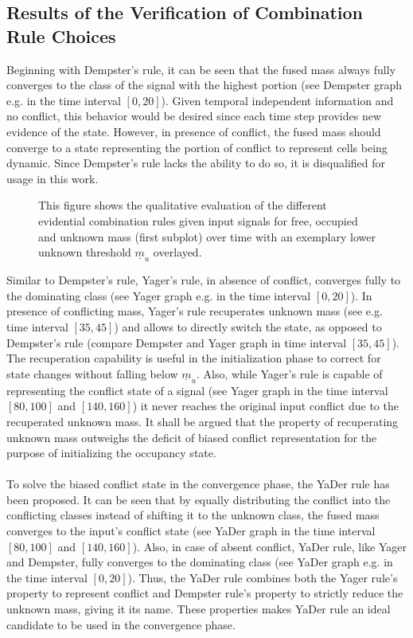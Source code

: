 \subsection{Results of the Verification of Combination Rule Choices}
\label{subsec:results_choice_comb_rule}
Beginning with Dempster's rule, it can be seen that the fused mass always fully converges to the class of the signal with the highest portion (see Dempster graph e.g. in the time interval $[0, 20]$). Given temporal independent information and no conflict, this behavior would be desired since each time step provides new evidence of the state. However, in presence of conflict, the fused mass should converge to a state representing the portion of conflict to represent cells being dynamic. Since Dempster's rule lacks the ability to do so, it is disqualified for usage in this work.
\begin{figure}[H]
	\begin{center}
		\caption{\label{fig:ds_comb_rule_comparison}This figure shows the qualitative evaluation of the different evidential combination rules given input signals for free, occupied and unknown mass (first subplot) over time with an exemplary lower unknown threshold $\underline{m}_u$ overlayed.}
	\end{center}
\end{figure} 
Similar to Dempster's rule, Yager's rule, in absence of conflict, converges fully to the dominating class (see Yager graph e.g. in the time interval $[0, 20]$). In presence of conflicting mass, Yager's rule recuperates unknown mass (see e.g. time interval $[35, 45]$) and allows to directly switch the state, as opposed to Dempster's rule (compare Dempster and Yager graph in time interval $[35, 45]$). The recuperation capability is useful in the initialization phase to correct for state changes without falling below $\underline{m}_u$. Also, while Yager's rule is capable of representing the conflict state of a signal (see Yager graph in the time interval $[80, 100]$ and $[140, 160]$) it never reaches the original input conflict due to the recuperated unknown mass. It shall be argued that the property of recuperating unknown mass outweighs the deficit of biased conflict representation for the purpose of initializing the occupancy state.  
\\\\
To solve the biased conflict state in the convergence phase, the YaDer rule has been proposed. It can be seen that by equally distributing the conflict into the conflicting classes instead of shifting it to the unknown class, the fused mass converges to the input's conflict state (see YaDer graph in the time interval $[80, 100]$ and $[140, 160]$). Also, in case of absent conflict, YaDer rule, like Yager and Dempster, fully converges to the dominating class (see YaDer graph e.g. in the time interval $[0,20]$). Thus, the YaDer rule combines both the Yager rule's property to represent conflict and Dempster rule's property to strictly reduce the unknown mass, giving it its name. These properties makes YaDer rule an ideal candidate to be used in the convergence phase.
